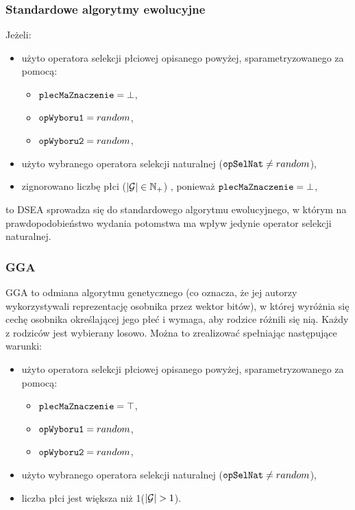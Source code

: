 \documentclass[./FM_mgr.tex]{subfiles}
\begin{document}
\subsubsection{Standardowe algorytmy ewolucyjne}

Jeżeli:
\begin{itemize}
	\item użyto operatora selekcji płciowej opisanego powyżej, sparametryzowanego za pomocą:
	\begin{itemize}
		\item $\mathtt{plecMaZnaczenie} = \bot$,
		\item $\mathtt{opWyboru1} = random$,
		\item $\mathtt{opWyboru2} = random$,
	\end{itemize}
	\item użyto wybranego operatora selekcji naturalnej ($\mathtt{opSelNat} \neq random$),
	\item zignorowano liczbę płci ($|\mathcal{G}| \in \mathbb{N}_{+}$) , ponieważ $\mathtt{plecMaZnaczenie} = \bot$,
\end{itemize}
to DSEA sprowadza się do standardowego algorytmu ewolucyjnego, w którym na prawdopodobieństwo wydania potomstwa ma wpływ jedynie operator selekcji naturalnej.

\subsubsection{GGA}

GGA \cite{GGA} to odmiana algorytmu genetycznego (co oznacza, że jej autorzy wykorzystywali reprezentację osobnika przez wektor bitów), w której wyróżnia się cechę osobnika określającej jego płeć i wymaga, aby rodzice różnili się nią. Każdy z rodziców jest wybierany losowo. Można to zrealizować spełniając następujące warunki:
\begin{itemize}
	\item użyto operatora selekcji płciowej opisanego powyżej, sparametryzowanego za pomocą:
	\begin{itemize}
		\item $\mathtt{plecMaZnaczenie} = \top$,
		\item $\mathtt{opWyboru1} = random$,
		\item $\mathtt{opWyboru2} = random$,
	\end{itemize}
	\item użyto wybranego operatora selekcji naturalnej ($\mathtt{opSelNat} \neq random$),
	\item liczba płci jest większa niż 1($|\mathcal{G}| > 1$).
\end{itemize}
\end{document}
